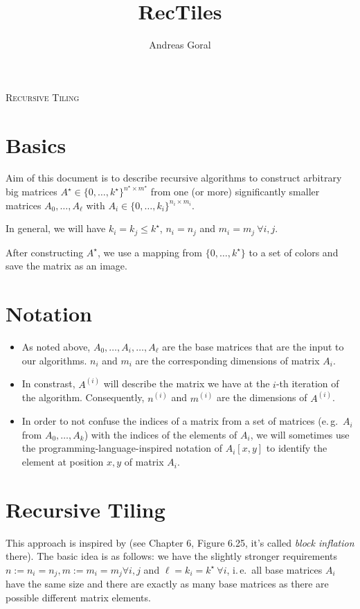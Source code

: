 \documentclass[a4paper,11pt]{article}
\title{RecTiles}
\author{Andreas Goral}
\theoremstyle{mystyle}
\newcommand{\ie}{i.\,e.\ }
\newcommand{\eg}{e.\,g.\ }
\begin{document}
\thispagestyle{empty}
\begin{center}
\textsc{
{\huge Recursive Tiling}}\\[1cm]
\end{center}
\tableofcontents
\newpage
\section{Basics}
Aim of this document is to describe recursive algorithms to construct arbitrary big matrices $A^\star \in \{0,\dots, k^\star\}^{n^\star \times m^\star}$ from one (or more) significantly smaller matrices $A_0, \dots, A_\ell$ with $A_i \in \{0, \dots ,k_i\}^{n_i \times m_i}$.

In general, we will have $k_i = k_j \leq k^\star$, $n_i = n_j$ and $m_i = m_j ~ \forall i, j$. 

After constructing $A^\star$, we use a mapping from $\{0, \dots, k^\star\}$ to a set of colors and save the matrix as an image.

\section{Notation}
\begin{itemize}
	\item As noted above, $A_0, \dots, A_i, \dots, A_\ell$ are the base matrices that are the input to our algorithms. $n_i$ and $m_i$ are the corresponding dimensions of matrix $A_i$.
	\item In constrast, $A^{(i)}$ will describe the matrix we have at the $i$-th iteration of the algorithm. Consequently, $n^{(i)}$ and $m^{(i)}$ are the dimensions of $A^{(i)}$.
	\item In order to not confuse the indices of a matrix from a set of matrices (\eg $A_i$ from $A_0, \dots, A_k$) with the indices of the elements of $A_i$, we will sometimes use the programming-language-inspired notation of $A_i\left[x,y\right]$ to identify the element at position $x,y$ of matrix $A_i$.
\end{itemize}

\section{Recursive Tiling}
This approach is inspired by \cite{BaakeG13} (see Chapter 6, Figure 6.25, it's called \emph{block inflation} there).
The basic idea is as follows: we have the slightly stronger requirements $n := n_i = n_j , m := m_i=m_j \forall i,j$ and $\ell = k_i = k^\star ~ \forall i$, \ie all base matrices $A_i$ have the same size and there are exactly as many base matrices as there are possible different matrix elements.
\end{document}
